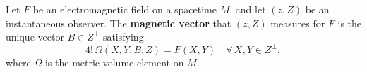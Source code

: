 Let $F$ be an electromagnetic field on a spacetime $M$, and let $(z, Z)$ be an instantaneous observer. The \textbf{magnetic vector} that $(z, Z)$ measures for $F$ is the unique vector $B \in Z^\perp$ satisfying
$$4! \, \Omega(X, Y, B, Z) = F(X, Y) \quad \forall\, X, Y \in Z^\perp,$$
where $\Omega$ is the metric volume element on $M$.

